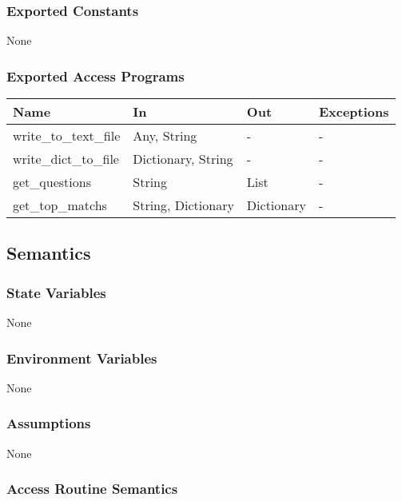 \documentclass[12pt, titlepage]{article}
\begin{document}
\subsubsection{Exported Constants}

None

\subsubsection{Exported Access Programs}

\begin{center}
\begin{tabular}{p{3.5cm} p{4.5cm} p{3cm} p{2cm}}
\hline
\textbf{Name} & \textbf{In} & \textbf{Out} & \textbf{Exceptions} \\
\hline
write\_to\_text\_file & Any, String & - & - \\
write\_dict\_to\_file & Dictionary, String & - & - \\
get\_questions & String & List & - \\
get\_top\_matchs & String, Dictionary & Dictionary & - \\

\hline
\end{tabular}
\end{center}

\subsection{Semantics}

\subsubsection{State Variables}

None

\subsubsection{Environment Variables}

None

\subsubsection{Assumptions}

None

\subsubsection{Access Routine Semantics}
\end{document}
